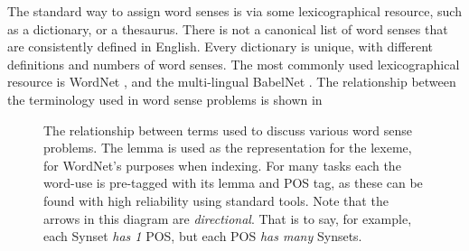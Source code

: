 \documentclass[12pt,parskip]{komatufte}
\begin{document}
The standard way to assign word senses is via some lexicographical resource, such as a dictionary, or a thesaurus.
There is not a canonical list of word senses that are consistently defined in English.
Every dictionary is unique, with different definitions and numbers of word senses.
The most commonly used lexicographical resource is WordNet , and the multi-lingual  BabelNet .
The relationship between the terminology used in word sense problems is shown in 


\begin{figure}
	\caption{The relationship between terms used to discuss various word sense problems.
		The lemma is used as the representation for the lexeme, for WordNet's purposes when indexing.
		For many tasks each the word-use is pre-tagged with its lemma and POS tag,
		as these can be found with high reliability using standard tools.
		Note that the arrows in this diagram are \emph{directional}.
		That is to say, for example, each Synset \emph{has 1} POS,
		but each POS \emph{has many} Synsets.
	}
	\label{fig:wordsenseterms}

\end{figure}
\end{document}
